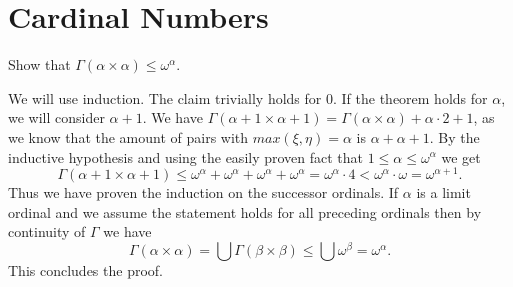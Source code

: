 \section{Cardinal Numbers}

\begin{problem}
  Show that $\Gamma (\alpha \times \alpha) \le \omega^{\alpha}$.
\end{problem}

\begin{solution}
  We will use induction.
  The claim trivially holds for $0$.
  If the theorem holds for $\alpha$, we will consider $\alpha + 1$.
  We have $\Gamma(\alpha + 1 \times \alpha + 1) = \Gamma(\alpha \times \alpha) + \alpha \cdot 2 + 1$, as we know that the amount of pairs with $max(\xi, \eta) = \alpha$ is $\alpha + \alpha + 1$.
  By the inductive hypothesis and using the easily proven fact that $1 \le \alpha \le \omega^{\alpha}$ we get
  \[\Gamma(\alpha + 1 \times \alpha + 1) \le \omega^{\alpha} + \omega^{\alpha} + \omega^{\alpha} + \omega^{\alpha} = \omega^{\alpha} \cdot 4 < \omega^{\alpha} \cdot \omega = \omega^{\alpha + 1}.\]
  Thus we have proven the induction on the successor ordinals.
  If $\alpha$ is a limit ordinal and we assume the statement holds for all preceding ordinals then by continuity of $\Gamma$ we have
  \[\Gamma(\alpha \times \alpha) = \bigcup \Gamma(\beta \times \beta) \le \bigcup \omega^{\beta} = \omega^{\alpha}.\]
  This concludes the proof.
\end{solution}
